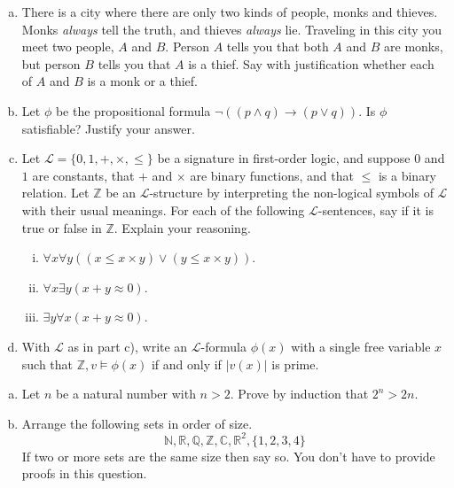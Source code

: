 \documentclass{article}
\begin{document}
\begin{Q}
\begin{enumerate}[a)]
\item There is a city where there are only two kinds of people, monks and thieves. Monks \emph{always} tell the truth, and thieves \emph{always} lie. Traveling in this city you meet two people, $A$ and $B$. Person $A$ tells you that both $A$ and $B$ are monks, but person $B$ tells you that $A$ is a thief. Say with justification whether each of $A$ and $B$ is a monk or a thief.
\item Let $\phi$ be the propositional formula $\neg((p\wedge q)\rightarrow (p\vee q))$. Is $\phi$ satisfiable? Justify your answer.
\item Let $\mathscr L = \{0,1,+,\times, \leq\}$ be a signature in first-order logic, and suppose $0$ and $1$ are constants, that $+$ and $\times$ are binary functions, and that $\leq$ is a binary relation. Let $\mathbb Z$ be an $\mathscr L$-structure by interpreting the non-logical symbols of $\mathscr L$ with their usual meanings. For each of the following $\mathscr L$-sentences, say if it is true or false in $\mathbb Z$. Explain your reasoning.
\begin{enumerate}[i)]
\item $\forall x\forall y( (x \leq x\times y) \vee (y\leq x\times y))$.
\item $\forall x\exists y(x + y \approx 0)$.
\item $\exists y \forall x(x + y \approx 0)$.
\end{enumerate}
\item With $\mathscr L$ as in part c), write an $\mathscr L$-formula $\phi(x)$ with a single free variable $x$ such that $\mathbb Z,v\models \phi(x)$ if and only if $|v(x)|$ is prime.
\end{enumerate}
\end{Q}



\begin{Q}
\begin{enumerate}[a)]
 \item Let $n$ be a natural number with $n >2$. Prove by induction that $2^n > 2n$.
\item Arrange the following sets in order of size. 
\[\mathbb N, \mathbb R, \mathbb Q, \mathbb Z, \mathbb C, \mathbb R^2, \{1,2,3,4\}\]
If two or more sets are the same size then say so. You don't have to provide proofs in this question.
\end{enumerate}
\end{Q}
\end{document}
